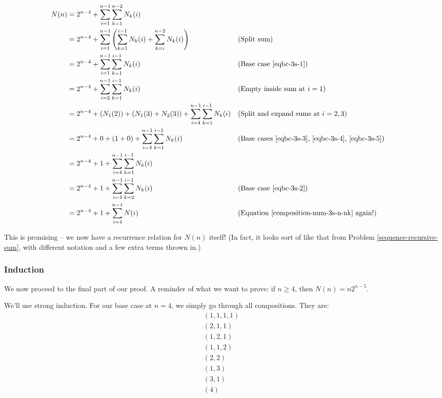 \begin{align*}
N(n) &= 2^{n-4} + \sum_{i=1}^{n-1} \sum_{k=1}^{n-2} N_{k}(i) \\
&= 2^{n-4} + \sum_{i=1}^{n-1} \left( \sum_{k=1}^{i-1} N_{k}(i) + \sum_{k=i}^{n-2} N_{k}(i) \right) && \text{(Split sum)} \\
&= 2^{n-4} + \sum_{i=1}^{n-1} \sum_{k=1}^{i-1} N_{k}(i) && \text{(Base case \ref{eqbc-3s-1})} \\
&= 2^{n-4} + \sum_{i=2}^{n-1} \sum_{k=1}^{i-1} N_{k}(i) && \text{(Empty inside sum at $i=1$)} \\
&= 2^{n-4} + \left( N_1(2) \right) + \left( N_1(3) + N_2(3) \right) + \sum_{i=4}^{n-1} \sum_{k=1}^{i-1} N_{k}(i) && \text{(Split and expand sums at $i=2,3$)} \\
&= 2^{n-4} + 0 + \left( 1 + 0 \right) + \sum_{i=4}^{n-1} \sum_{k=1}^{i-1} N_{k}(i) && \text{(Base cases \ref{eqbc-3s-3}, \ref{eqbc-3s-4}, \ref{eqbc-3s-5})} \\
&= 2^{n-4} + 1 + \sum_{i=4}^{n-1} \sum_{k=1}^{i-1} N_{k}(i) \\
&= 2^{n-4} + 1 + \sum_{i=4}^{n-1} \sum_{k=2}^{i-1} N_{k}(i) && \text{(Base case \ref{eqbc-3s-2})} \\
&= 2^{n-4} + 1 + \sum_{i=4}^{n-1} N(i) && \text{(Equation \ref{composition-num-3s-n-nk} again!)} \\
\end{align*}

This is promising -- we now have a recurrence relation for $N(n)$ itself! (In fact, it looks sort of like that from Problem \ref{sequence-recursive-sum}, with different notation and a few extra terms thrown in.)


\subsubsection{Induction}

We now proceed to the final part of our proof. A reminder of what we want to prove: if $n \geq 4$, then $N(n) = n2^{n-5}$.

We'll use strong induction. For our base case at $n = 4$, we simply go through all compositions. They are:
\begin{gather*}
(1, 1, 1, 1) \\
(2, 1, 1) \\
(1, 2, 1) \\
(1, 1, 2) \\
(2, 2) \\
(1, 3) \\
(3, 1) \\
(4)
\end{gather*}

